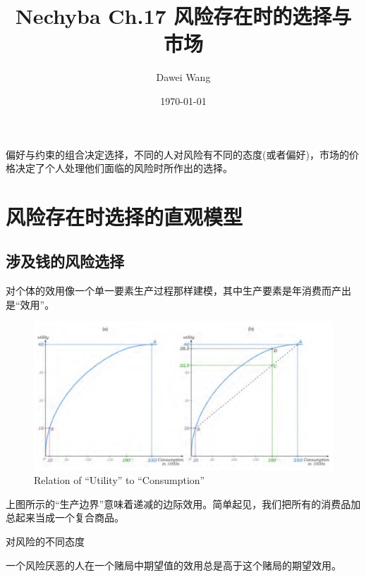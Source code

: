 \documentclass{article}
\title{Nechyba Ch.17 风险存在时的选择与市场}
\author{Dawei Wang}
\date{\today}
\begin{document}
	\maketitle
    偏好与约束的组合决定选择，不同的人对风险有不同的态度(或者偏好)，市场的价格决定了个人处理他们面临的风险时所作出的选择。

\section{风险存在时选择的直观模型}

\subsection{涉及钱的风险选择}

对个体的效用像一个单一要素生产过程那样建模，其中生产要素是年消费而产出是“效用”。

\begin{figure}[H] %
	\centering %
	\includegraphics[width=1\textwidth]{17_1} %
	\caption{Relation of “Utility” to “Consumption”} %
	\label{Fig.main2} %
\end{figure}

上图所示的“生产边界”意味着递减的边际效用。简单起见，我们把所有的消费品加总起来当成一个复合商品。

\hspace*{\fill}

对风险的不同态度

一个风险厌恶的人在一个赌局中期望值的效用总是高于这个赌局的期望效用。
\end{document}
